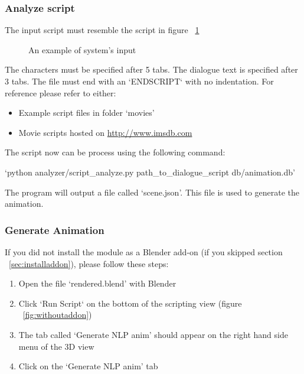 \subsubsection{Analyze script \label{sec:analyze-script}}
\noindent The input script must resemble the script in figure ~\ref{fig:inputscript2}

\begin{figure}[!ht]
	\centerline{}
	\caption{An example of system's input}\label{fig:inputscript2}
\end{figure}

\noindent The characters must be specified after 5 tabs. The dialogue text is specified after 3 tabs. The file must end with an `ENDSCRIPT` with no indentation. For reference please refer to either:
\begin{itemize}
	\item Example script files in folder `movies'
	\item Movie scripts hosted on \url{http://www.imsdb.com}
\end{itemize}

\noindent The script now can be process using the following command:

\indent `python analyzer/script\_analyze.py path\_to\_dialogue\_script db/animation.db'

\noindent The program will output a file called `scene.json'. This file is used to generate the animation.

\subsubsection{Generate Animation}
\noindent If you did not install the module as a Blender add-on (if you skipped section ~\ref{sec:installaddon}), please follow these steps:
\begin{enumerate}
	\item Open the file `rendered.blend' with Blender
	\item Click `Run Script` on the bottom of the scripting view (figure ~\ref{fig:withoutaddon})
	\item The tab called `Generate NLP anim' should appear on the right hand side menu of the 3D view
	\item Click on the `Generate NLP anim' tab
\end{enumerate}

